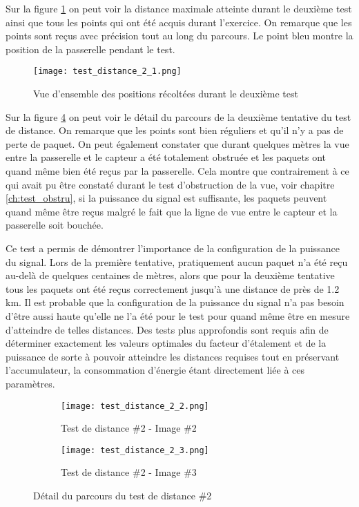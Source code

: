 Sur la figure \ref{fig:test_distance_2_1} on peut voir la distance maximale atteinte durant le deuxième test ainsi que tous les points qui ont été acquis durant l'exercice. On remarque que les points sont reçus avec précision tout au long du parcours. Le point bleu montre la position de la passerelle pendant le test.

\begin{figure}[htb]
\centering
\texttt{[image: test\_distance\_2\_1.png]} 
\caption{Vue d'ensemble des positions récoltées durant le deuxième test}
\label{fig:test_distance_2_1}
\end{figure}

Sur la figure \ref{fig:test_distance_2_2} on peut voir le détail du parcours de la deuxième tentative du test de distance. On remarque que les points sont bien réguliers et qu'il n'y a pas de perte de paquet. On peut également constater que durant quelques mètres la vue entre la passerelle et le capteur a été totalement obstruée et les paquets ont quand même bien été reçus par la passerelle. Cela montre que contrairement à ce qui avait pu être constaté durant le test d'obstruction de la vue, voir chapitre \ref{ch:test_obstru}, si la puissance du signal est suffisante, les paquets peuvent quand même être reçus malgré le fait que la ligne de vue entre le capteur et la passerelle soit bouchée.

Ce test a permis de démontrer l'importance de la configuration de la puissance du signal. Lors de la première tentative, pratiquement aucun paquet n'a été reçu au-delà de quelques centaines de mètres, alors que pour la deuxième tentative tous les paquets ont été reçus correctement jusqu'à une distance de près de 1.2 km. Il est probable que la configuration de la puissance du signal n'a pas besoin d'être aussi haute qu'elle ne l'a été pour le test pour quand même être en mesure d'atteindre de telles distances. Des tests plus approfondis sont requis afin de déterminer exactement les valeurs optimales du facteur d'étalement et de la puissance de sorte à pouvoir atteindre les distances requises tout en préservant l'accumulateur, la consommation d'énergie étant directement liée à ces paramètres.

\begin{figure}[tb]
\centering
\begin{subfigure}{0.9\textwidth}
  \centering
  \texttt{[image: test\_distance\_2\_2.png]}
  \caption{Test de distance \#2 - Image \#2}
  \label{fig:test_distance_2_2_2}
\end{subfigure}%

\begin{subfigure}{0.9\textwidth}
  \centering
  \texttt{[image: test\_distance\_2\_3.png]}
  \caption{Test de distance \#2 - Image \#3}
  \label{fig:test_distance_2_3}
\end{subfigure}
\caption{Détail du parcours du test de distance \#2}
\label{fig:test_distance_2_2}
\end{figure}

